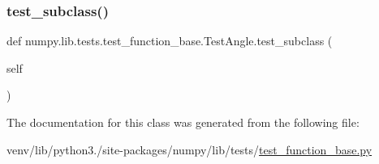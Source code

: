 \mbox{\label{classnumpy_1_1lib_1_1tests_1_1test__function__base_1_1TestAngle_ae0cab217b2149dc5d978cd92d0a02e26}} 
\subsubsection{\texorpdfstring{test\+\_\+subclass()}{test\_subclass()}}
{\footnotesize\ttfamily def numpy.\+lib.\+tests.\+test\+\_\+function\+\_\+base.\+Test\+Angle.\+test\+\_\+subclass (\begin{DoxyParamCaption}\item[{}]{self }\end{DoxyParamCaption})}



The documentation for this class was generated from the following file\+:\begin{DoxyCompactItemize}
\item 
venv/lib/python3./site-\/packages/numpy/lib/tests/\hyperlink{lib_2tests_2test__function__base_8py}{test\+\_\+function\+\_\+base.\+py}\end{DoxyCompactItemize}

